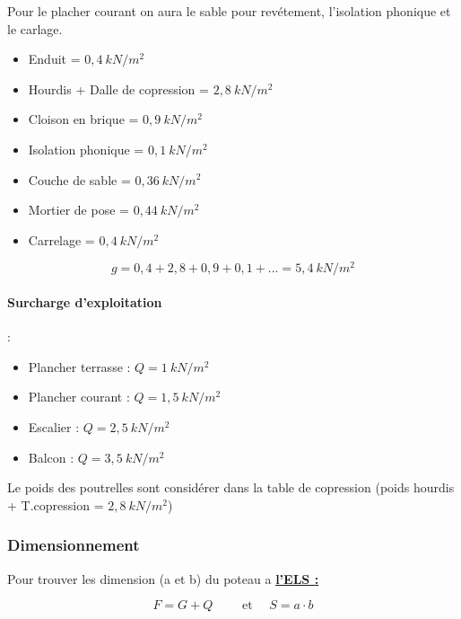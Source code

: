 \documentclass[12pt,a4paper]{article}
\begin{document}
	Pour le placher courant on aura le sable pour revétement, l'isolation phonique et le carlage.
	
	\begin{itemize}
		\item Enduit = $0,4~\unit{kN\per m^{2}}$
		\item Hourdis + Dalle de copression = $2,8~\unit{kN\per m^{2}}$
		\item Cloison en brique = $0,9~\unit{kN\per m^{2}}$
		\item Isolation phonique = $0,1~\unit{kN\per m^{2}}$
		\item Couche de sable = $0,36~\unit{kN\per m^{2}}$
		\item Mortier de pose = $0,44~\unit{kN\per m^{2}}$
		\item Carrelage = $0,4~\unit{kN\per m^{2}}$
	\end{itemize}
	
	\[ g = 0,4 + 2,8 + 0,9 + 0,1 +... = 5,4~\unit{kN\per m^{2}} \]
	
	\paragraph{Surcharge d'exploitation} :
	
	\begin{itemize}
		\item Plancher terrasse : $Q = 1~\unit{kN\per m^{2}}$
		\item Plancher courant : $Q = 1,5~\unit{kN\per m^{2}}$
		\item Escalier : $Q = 2,5~\unit{kN\per m^{2}}$
		\item Balcon : $Q = 3,5~\unit{kN\per m^{2}}$
	\end{itemize}
	
	
	\begin{tcolorbox}[colback=gray!20, colframe=black, title=Remarque]
		Le poids des poutrelles sont considérer dans la table de copression (poids hourdis + T.copression = $2,8~\unit{kN\per m^{2}}$)
	\end{tcolorbox}
	
	
	
	
	
	
	\subsubsection{Dimensionnement}
	
	Pour trouver les dimension (a et b) du poteau a \underline{\textbf{l'ELS :}}
	
	\[ F = G + Q \qquad \text{ et } \quad S = a \cdot b \]
	
\end{document}
